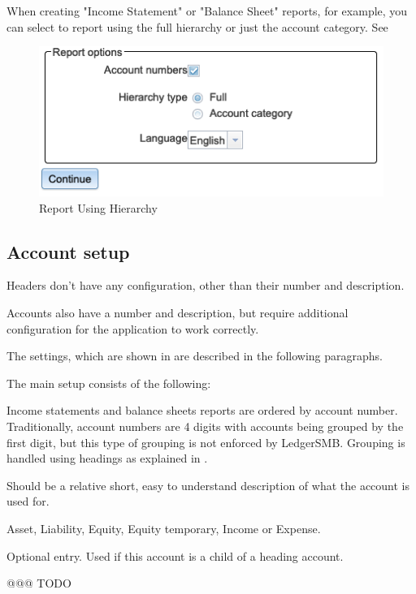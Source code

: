 When creating "Income Statement"  or "Balance Sheet" reports, for example,  you can select to report using the full hierarchy or just the account category.  See 

\begin{figure}[H]
\centering
\includegraphics[width=\graphicswidth]{images/reports-select-hierarchy.png}
\caption{Report Using Hierarchy}
\label{fig:config-report-hierarchy}
\end{figure}

\subsection{Account setup}
\label{sec-coa-account-setup}

Headers don't have any configuration, other than their number and description. 

Accounts also
have a number and description, but require additional configuration for the application to work
correctly. 

The settings, which are shown in  are described in the following paragraphs.

The main setup consists of the following:

\begin{description}[style=nextline]
    \item[Account Number] Income statements and balance sheets reports are ordered by account number. Traditionally, account numbers are 4 digits with accounts being grouped by the first digit, but this type of grouping is not enforced by LedgerSMB. Grouping is handled using headings as explained in .
    \item[Description] Should be a relative short, easy to understand description of what the account is used for.
    \item[Account Type] Asset, Liability, Equity, Equity temporary, Income or Expense.
    \item[Heading] Optional entry. Used if this account is a child of a heading account.
    \item[Negative balance heading] @@@ TODO
\end{description}

